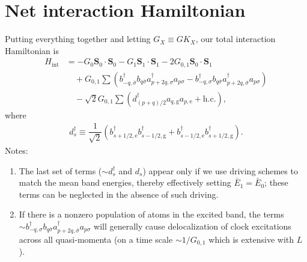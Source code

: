 \documentclass[aps,notitlepage,nofootinbib,11pt]{revtex4-1}
\renewcommand{\t}{\text} %
\newcommand{\f}[2]{\dfrac{#1}{#2}} %
\newcommand{\p}[1]{\left(#1\right)} %
\renewcommand{\v}{\bm} %
\renewcommand{\c}{\cdot} %
\newcommand{\1}{\mathds{1}}
\newcommand{\g}{\text{g}}
\newcommand{\e}{\text{e}}
\begin{document}
\section{Net interaction Hamiltonian}

Putting everything together and letting $G_X\equiv G K_X$, our total
interaction Hamiltonian is
\begin{align}
  H_{\t{int}}
  &= - G_0\v S_0\c\v S_0 - G_1\v S_1\c\v S_1 - 2 G_{0,1}\v S_0\c\v S_1
  \tag*{} \\ &\quad + G_{0,1} \sum
  \p{b_{-q,\bar\sigma}^\dag b_{q\bar\sigma} a_{p+2q,\sigma}^\dag a_{p\sigma}
    - b_{-q,\sigma}^\dag b_{q\bar\sigma} a_{p+2q,\bar\sigma}^\dag a_{p\sigma}}
  \tag*{} \\ &\quad - \sqrt2 G_{0,1} \sum
  \p{d_{\p{p+q}/2}^\dag a_{q,\g} a_{p,\e} + \t{h.c.}},
\end{align}
where
\begin{align}
  d_s^\dag \equiv \f1{\sqrt2}
  \p{b_{s+1/2,\e}^\dag b_{s-1/2,\g}^\dag
    + b_{s-1/2,\e}^\dag b_{s+1/2,\g}^\dag}.
\end{align}
Notes:
\begin{enumerate}[label=(\roman*)]
\item The last set of terms ($\sim d_s^\dag$ and $d_s$) appear only if
  we use driving schemes to match the mean band energies, thereby
  effectively setting $\bar E_1=\bar E_0$; these terms can be
  neglected in the absence of such driving.
\item If there is a nonzero population of atoms in the excited band,
  the terms
  $\sim b_{-q,\sigma}^\dag b_{q\bar\sigma} a_{p+2q,\bar\sigma}^\dag
  a_{p\sigma}$ will generally cause delocalization of clock
  excitations across all quasi-momenta (on a time scale
  $\sim1/G_{0,1}$ which is extensive with $L$).
\end{enumerate}
\end{document}
